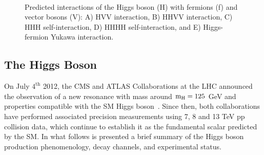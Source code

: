 \begin{figure}[htp!]
\captionsetup[subfigure]{justification=centering}
\centering
{}
\\
\caption[Predicted interactions of the Higgs boson with fermions and vector bosons]{Predicted interactions of the Higgs boson (H) with fermions (f) and vector bosons (V): A) HVV interaction, B) HHVV interaction, C) HHH self-interaction, D) HHHH self-interaction, and E) Higgs-fermion Yukawa interaction.}
\label{fig:hinteractions}
\end{figure}

\subsection{The Higgs Boson}
On July $\mathrm{4^{th}}$ 2012, the CMS and ATLAS Collaborations at the LHC announced the observation of a new resonance with mass around $\mathrm{m_{H}}=125$ GeV and properties compatible with the SM Higgs boson~\cite{atlashiggs,cmshiggs}.  Since then, both collaborations have performed associated precision measurements using 7, 8 and 13 TeV pp collision data, which continue to establish it as the fundamental scalar predicted by the SM. In what follows is presented a brief summary of the Higgs boson production phenomenology, decay channels, and experimental status. 

